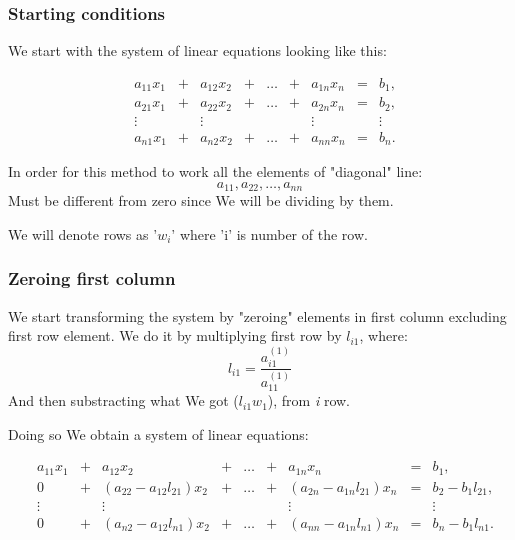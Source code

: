 \documentclass[12pt]{report}
\begin{document}
\subsubsection{Starting conditions}
We start with the system of linear equations looking like this:

\[
\begin{matrix}

&a_{11}x_1 &{}+&a_{12}x_2&+&\dots&+&a_{1n}x_n &=&b_1,\\

&a_{21}x_1 &{}+&a_{22}x_2&+&\dots&+&a_{2n}x_n &=&b_2,\\

&\vdots    &&\vdots      & &     & &  \vdots  & &\vdots\\

&a_{n1}x_1&{}+&a_{n2}x_2&+&\dots &+&a_{nn}x_n&=&b_n.

\end{matrix}
\]

In order for this method to work all the elements of "diagonal" line:
\[ a_{11}, a_{22}, \dots, a_{nn} \]
Must be different from zero since We will be dividing by them.

We will denote rows as '$w_i$' where 'i' is number of the row.

\subsubsection{Zeroing first column}
We start transforming the system by "zeroing" elements in first column excluding first row element. We do it by multiplying first row by $l_{i1}$, where:
\[ l_{i1} = \frac{ a_{i1}^{(1)} }
{ a_{11}^{(1)} }  \]
And then substracting what We got ($ l_{i1}w_1 $), from \textit{i} row.

Doing so We obtain a system of linear equations:

\[
\begin{matrix}

&a_{11}x_1 &{}+&a_{12}x_2&+&\dots&+&a_{1n}x_n &=&b_1,\\

&0 &{}+&(a_{22} - a_{12}l_{21})x_2&{}+&\dots&{}+&(a_{2n} - a_{1n}l_{21})x_n &=&b_2 - b_{1}l_{21},\\

&\vdots    &&\vdots      & &     & &  \vdots  & &\vdots\\

&0&{}+&(a_{n2} - a_{12}l_{n1})x_2&+&\dots &+&(a_{nn} - a_{1n}l_{n1})x_n&=&b_n - b_{1}l_{n1}.

\end{matrix}
\]
\end{document}
